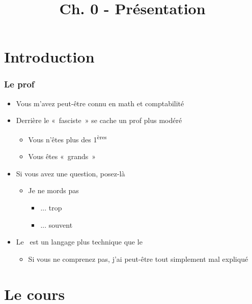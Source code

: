 


\title{Ch. 0 - Présentation}




\section{Introduction} 

\begin{frame}
\frametitle{Le prof}
\begin{itemize}[<+->]
\item Vous m'avez peut-être connu en math et comptabilité
\item Derrière le «~fasciste~» se cache un prof plus modéré \smiley
	\begin{itemize}
	\item Vous n'êtes plus des 1\textsuperscript{ères}
	\item Vous êtes «~grands~»
	\end{itemize} 
\item Si vous avez une question, posez-là
	\begin{itemize}
	\item Je ne mords pas
		\begin{itemize}
		\item ... trop
		\item ... souvent
		\end{itemize}
	\end{itemize}
\item Le \cpp\ est un langage plus technique que le \java
	\begin{itemize}
	\item Si vous ne comprenez pas, j'ai peut-être tout simplement mal expliqué
	\end{itemize}
\end{itemize}
\end{frame}

\section{Le cours}


